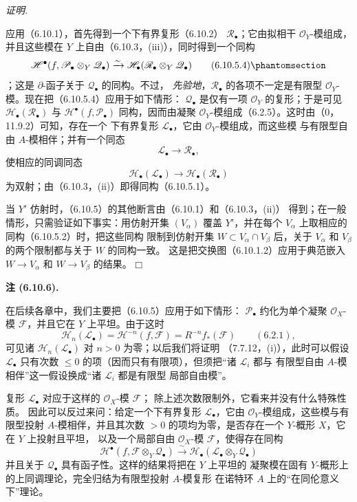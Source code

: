 \documentclass[UTF8,fontset=none,11pt,oneside,openany]{ctexbook}
\providecommand{\square}{\mdlgwhtsquare}
\newenvironment{remark}[1][]{%
  \par\medskip\noindent\textbf{注 (#1).}\ %
}{\par}
\newenvironment{proof}{%
  \par\smallskip\noindent\textit{证明.}\ %
}{\hfill$\square$\par}
\newcommand{\oldpage}[2][]{%
  \hypertarget{ega-source-page-#1-#2}{}%
  \marginnote{\scriptsize\textbf{#1}~|~#2}\ignorespaces}
\let\EGAOriginalLabel\label
\renewcommand{\label}[1]{\phantomsection\EGAOriginalLabel{#1}}
\begin{document}
\begin{proof}
应用（6.10.1），首先得到一个下有界复形（6.10.2）
$\mathscr R_\bullet$；它由拟相干 $\mathscr O_Y$-模组成，并且这些模在
$Y$ 上自由（6.10.3，(iii)），同时得到一个同构
\[
  \mathscr H^\bullet
  (f,\mathscr P_\bullet\otimes_Y\mathscr Q_\bullet)
  \xrightarrow{\sim}
  \mathscr H_\bullet
  (\mathscr R_\bullet\otimes_Y\mathscr Q_\bullet)
  \tag{6.10.5.4}\label{III.6.10.5.4.fr}
\]
；这是 $\partial$-函子关于 $\mathscr Q_\bullet$ 的同构。不过，
\emph{先验地}，$\mathscr R_\bullet$ 的各项不一定是有限型
$\mathscr O_Y$-模。现在把（6.10.5.4）应用于如下情形：
$\mathscr Q_\bullet$ 是仅有一项 $\mathscr O_Y$ 的复形；于是可见
$\mathscr H_\bullet(\mathscr R_\bullet)$ 与
$\mathscr H^\bullet(f,\mathscr P_\bullet)$ 同构，因而由凝聚
$\mathscr O_Y$-模组成（6.2.5）。这时由（0，11.9.2）可知，存在一个
下有界复形 $\mathscr L_\bullet$，它由 $\mathscr O_Y$-模组成，而这些模
与有限型自由 $A$-模相伴；并有一个同态
\[
  \mathscr L_\bullet\longrightarrow\mathscr R_\bullet,
\]
使相应的同调同态
\[
  \mathscr H_\bullet(\mathscr L_\bullet)
  \longrightarrow
  \mathscr H_\bullet(\mathscr R_\bullet)
\]
为双射；由（6.10.3，(ii)）即得同构（6.10.5.1）。

当 $Y'$ 仿射时，（6.10.5）的其他断言由（6.10.1）和（6.10.3，(ii)）
得到；在一般情形，只需验证如下事实：用仿射开集 $(V_\alpha)$ 覆盖
$Y'$，并在每个 $V_\alpha$ 上取相应的同构（6.10.5.2）时，把这些同构
限制到仿射开集 $W\subset V_\alpha\cap V_\beta$ 后，关于
$V_\alpha$ 和 $V_\beta$ 的两个限制都与关于 $W$ 的同构一致。
这是把交换图（6.10.1.2）应用于典范嵌入
$W\to V_\alpha$ 和 $W\to V_\beta$ 的结果。
\end{proof}

\begin{remark}[6.10.6]
在后续各章中，我们主要把（6.10.5）应用于如下情形：
$\mathscr P_\bullet$ 约化为单个凝聚 $\mathscr O_X$-模
$\mathscr F$，并且它在 $Y$ 上平坦。由于这时
\[
  \mathscr H_n(\mathscr L_\bullet)
  =
  \mathscr H^{-n}(f,\mathscr F)
  =
  R^{-n}f_*(\mathscr F)
  \qquad(6.2.1),
\]
可见诸 $\mathscr H_n(\mathscr L_\bullet)$ 对 $n>0$ 为零；以后我们将证明
（7.7.12，(i)），此时可以假设 $\mathscr L_\bullet$ 只有次数
$\leqslant0$ 的项（因而只有有限项），但须把“诸 $\mathscr L_i$ 都与
有限型自由 $A$-模相伴”这一假设换成“诸 $\mathscr L_i$ 都是有限型
局部自由模”。

复形 $\mathscr L_\bullet$ 对应于这样的 $\mathscr O_X$-模 $\mathscr F$；
除上述次数限制外，它看来并没有什么特殊性质。
\oldpage[III]{175}
因此可以反过来问：给定一个下有界复形 $\mathscr L_\bullet$，它由
$\mathscr O_Y$-模组成，这些模与有限型投射 $A$-模相伴，并且其次数
$>0$ 的项均为零，是否存在一个 $Y$-概形 $X$，它在 $Y$ 上投射且平坦，
以及一个局部自由 $\mathscr O_X$-模 $\mathscr F$，使得存在同构
\[
  \mathscr H^\bullet
  (f,\mathscr F\otimes_Y\mathscr Q_\bullet)
  \xrightarrow{\sim}
  \mathscr H_\bullet
  (\mathscr L_\bullet\otimes_Y\mathscr Q_\bullet)
\]
并且关于 $\mathscr Q_\bullet$ 具有函子性。这样的结果将把在 $Y$ 上平坦的
凝聚模在固有 $Y$-概形上的上同调理论，完全归结为有限型投射 $A$-模复形
在诺特环 $A$ 上的“在同伦意义下”理论。
\end{remark}
\end{document}
